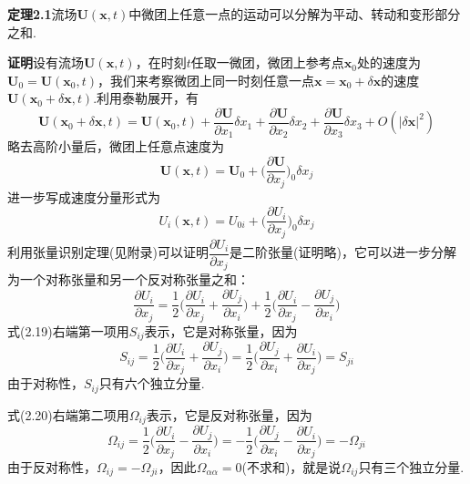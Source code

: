 \noindent\textbf{定理2.1}\quad 流场$\boldsymbol{U}(\boldsymbol{x},t)$中微团上任意一点的运动可以分解为平动、转动和变形部分之和.

\noindent\textbf{证明}\quad 设有流场$\boldsymbol{U}(\boldsymbol{x},t)$，在时刻$t$任取一微团，微团上参考点$\boldsymbol{x}_0$处的速度为$\boldsymbol{U}_0=\boldsymbol{U}(\boldsymbol{x}_0,t)$，我们来考察微团上同一时刻任意一点$\boldsymbol{x}=\boldsymbol{x}_0+\delta\boldsymbol{x}$的速度$\boldsymbol{U}(\boldsymbol{x}_0+\delta\boldsymbol{x},t)$.利用泰勒展开，有
\[
\boldsymbol{U}(\boldsymbol{x}_0+\delta\boldsymbol{x},t)=\boldsymbol{U}(\boldsymbol{x}_0,t)+\frac{\partial\boldsymbol{U}}{\partial x_1}\delta x_1+\frac{\partial\boldsymbol{U}}{\partial x_2}\delta x_2+\frac{\partial\boldsymbol{U}}{\partial x_3}\delta x_3+O(|\delta\boldsymbol{x}|^{2})
\]
略去高阶小量后，微团上任意点速度为
\[
\boldsymbol{U}(\boldsymbol{x},t)=\boldsymbol{U}_0+\Big(\frac{\partial\boldsymbol{U}}{\partial x_j}\Big)_{\!0}\delta x_j
\]
进一步写成速度分量形式为
\[
U_i(\boldsymbol{x},t)=U_{0i}+\Big(\frac{\partial U_i}{\partial x_j}\Big)_{\!0}\delta x_j
\]
利用张量识别定理(见附录)可以证明$\dfrac{\partial U_i}{\partial x_j}$是二阶张量(证明略)，它可以进一步分解为一个对称张量和另一个反对称张量之和：
\begin{equation*}
\frac{\partial U_i}{\partial x_j}=\frac{1}{2}\Big(\frac{\partial U_i}{\partial x_j}+\frac{\partial U_j}{\partial x_i}\Big)+\frac{1}{2}\Big(\frac{\partial U_i}{\partial x_j}-\frac{\partial U_j}{\partial x_i}\Big)
\tag{2.19}
\end{equation*}
式(2.19)右端第一项用$S_{ij}$表示，它是对称张量，因为
\begin{equation*}
S_{ij}=\frac{1}{2}\Big(\frac{\partial U_i}{\partial x_j}+\frac{\partial U_j}{\partial x_i}\Big)=\frac{1}{2}\Big(\frac{\partial U_j}{\partial x_i}+\frac{\partial U_i}{\partial x_j}\Big)=S_{ji}
\tag{2.20a}
\end{equation*}
由于对称性，$S_{ij}$只有六个独立分量.

式(2.20)右端第二项用$\Omega_{ij}$表示，它是反对称张量，因为
\begin{equation*}
\Omega_{ij}=\frac{1}{2}\Big(\frac{\partial U_i}{\partial x_j}-\frac{\partial U_j}{\partial x_i}\Big)=-\frac{1}{2}\Big(\frac{\partial U_j}{\partial x_i}-\frac{\partial U_i}{\partial x_j}\Big)=-\Omega_{ji}
\tag{2.20b}
\end{equation*}
由于反对称性，$\Omega_{ij}=-\Omega_{ji}$，因此$\Omega_{\alpha\alpha}=0$(不求和)，就是说$\Omega_{ij}$只有三个独立分量.

